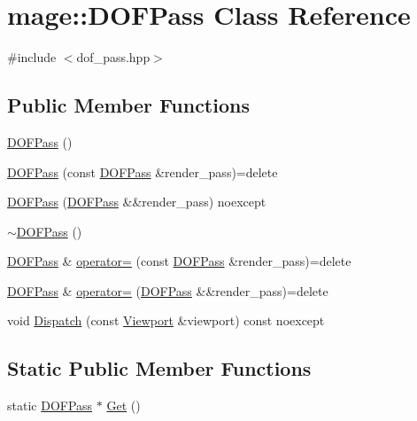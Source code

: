 \hypertarget{classmage_1_1_d_o_f_pass}{}\section{mage\+:\+:D\+O\+F\+Pass Class Reference}
\label{classmage_1_1_d_o_f_pass}


{\ttfamily \#include $<$dof\+\_\+pass.\+hpp$>$}

\subsection*{Public Member Functions}
\begin{DoxyCompactItemize}
\item 
\hyperlink{classmage_1_1_d_o_f_pass_a11dccae5f2613da112845158f69727e7}{D\+O\+F\+Pass} ()
\item 
\hyperlink{classmage_1_1_d_o_f_pass_a481180bac0436c5e3f627fcd810e699c}{D\+O\+F\+Pass} (const \hyperlink{classmage_1_1_d_o_f_pass}{D\+O\+F\+Pass} \&render\+\_\+pass)=delete
\item 
\hyperlink{classmage_1_1_d_o_f_pass_a800ce820beadcec67fd1477d57ccb9e2}{D\+O\+F\+Pass} (\hyperlink{classmage_1_1_d_o_f_pass}{D\+O\+F\+Pass} \&\&render\+\_\+pass) noexcept
\item 
\hyperlink{classmage_1_1_d_o_f_pass_a2a46bc7b2579f1d67fd412c89386d2f4}{$\sim$\+D\+O\+F\+Pass} ()
\item 
\hyperlink{classmage_1_1_d_o_f_pass}{D\+O\+F\+Pass} \& \hyperlink{classmage_1_1_d_o_f_pass_ab708ec4fdf564d5ce38453e7d46d04d8}{operator=} (const \hyperlink{classmage_1_1_d_o_f_pass}{D\+O\+F\+Pass} \&render\+\_\+pass)=delete
\item 
\hyperlink{classmage_1_1_d_o_f_pass}{D\+O\+F\+Pass} \& \hyperlink{classmage_1_1_d_o_f_pass_a8547ec1bb4e56faf3299e0793566b785}{operator=} (\hyperlink{classmage_1_1_d_o_f_pass}{D\+O\+F\+Pass} \&\&render\+\_\+pass)=delete
\item 
void \hyperlink{classmage_1_1_d_o_f_pass_a772b6b1b4a1f5a588f2c3342ef187db6}{Dispatch} (const \hyperlink{classmage_1_1_viewport}{Viewport} \&viewport) const noexcept
\end{DoxyCompactItemize}
\subsection*{Static Public Member Functions}
\begin{DoxyCompactItemize}
\item 
static \hyperlink{classmage_1_1_d_o_f_pass}{D\+O\+F\+Pass} $\ast$ \hyperlink{classmage_1_1_d_o_f_pass_a93327517f36b8558d6bdffedb6179298}{Get} ()
\end{DoxyCompactItemize}
